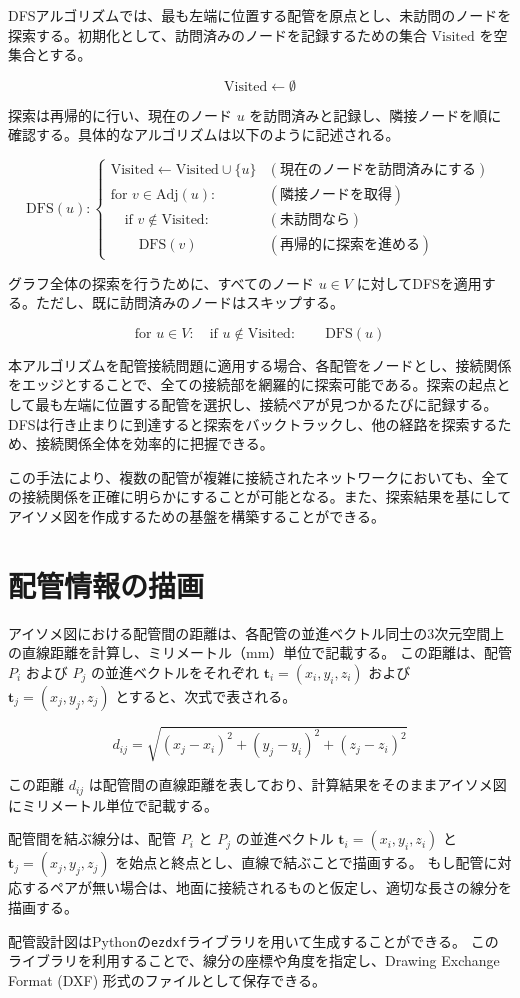 DFSアルゴリズムでは、最も左端に位置する配管を原点とし、未訪問のノードを探索する。初期化として、訪問済みのノードを記録するための集合 $\text{Visited}$ を空集合とする。

\[
\text{Visited} \gets \emptyset
\]

探索は再帰的に行い、現在のノード $u$ を訪問済みと記録し、隣接ノードを順に確認する。具体的なアルゴリズムは以下のように記述される。

\[
\text{DFS}(u):
\begin{cases}
  \text{Visited} \gets \text{Visited} \cup \{ u \} & (\text{現在のノードを訪問済みにする}) \\
  \text{for } v \in \text{Adj}(u): & (\text{隣接ノードを取得}) \\
  \quad \text{if } v \notin \text{Visited}: & (\text{未訪問なら}) \\
  \quad\quad \text{DFS}(v) & (\text{再帰的に探索を進める})
\end{cases}
\]

グラフ全体の探索を行うために、すべてのノード $u \in V$ に対してDFSを適用する。ただし、既に訪問済みのノードはスキップする。

\[
\text{for } u \in V:
\quad \text{if } u \notin \text{Visited}:
\quad\quad \text{DFS}(u)
\]

本アルゴリズムを配管接続問題に適用する場合、各配管をノードとし、接続関係をエッジとすることで、全ての接続部を網羅的に探索可能である。探索の起点として最も左端に位置する配管を選択し、接続ペアが見つかるたびに記録する。DFSは行き止まりに到達すると探索をバックトラックし、他の経路を探索するため、接続関係全体を効率的に把握できる。

この手法により、複数の配管が複雑に接続されたネットワークにおいても、全ての接続関係を正確に明らかにすることが可能となる。また、探索結果を基にしてアイソメ図を作成するための基盤を構築することができる。



\section{配管情報の描画}
アイソメ図における配管間の距離は、各配管の並進ベクトル同士の3次元空間上の直線距離を計算し、ミリメートル（mm）単位で記載する。
この距離は、配管 $P_i$ および $P_j$ の並進ベクトルをそれぞれ $\mathbf{t}_i = (x_i, y_i, z_i)$ および $\mathbf{t}_j = (x_j, y_j, z_j)$ とすると、次式で表される。

\[
d_{ij} = \sqrt{(x_j - x_i)^2 + (y_j - y_i)^2 + (z_j - z_i)^2}
\]

この距離 $d_{ij}$ は配管間の直線距離を表しており、計算結果をそのままアイソメ図にミリメートル単位で記載する。

配管間を結ぶ線分は、配管 $P_i$ と $P_j$ の並進ベクトル $\mathbf{t}_i = (x_i, y_i, z_i)$ と $\mathbf{t}_j = (x_j, y_j, z_j)$ を始点と終点とし、直線で結ぶことで描画する。
もし配管に対応するペアが無い場合は、地面に接続されるものと仮定し、適切な長さの線分を描画する。

配管設計図はPythonの\texttt{ezdxf}ライブラリを用いて生成することができる。
このライブラリを利用することで、線分の座標や角度を指定し、Drawing Exchange Format (DXF) 形式のファイルとして保存できる。
